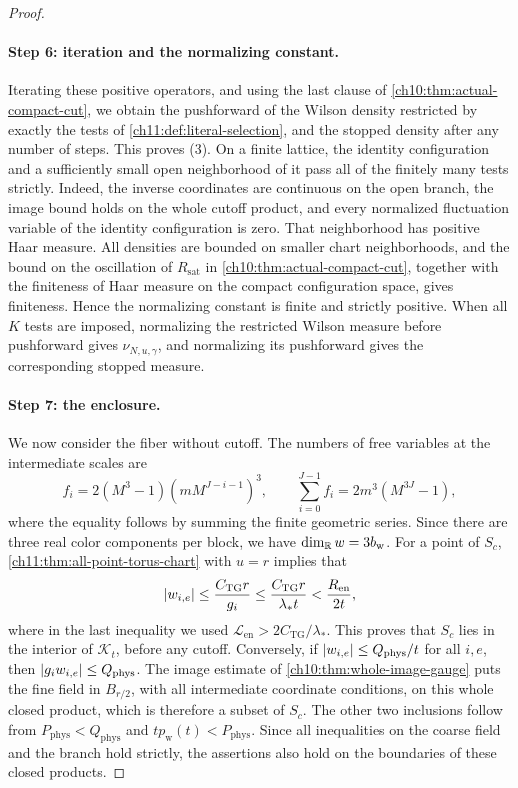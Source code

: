 \begin{proof}
\paragraph{Step 6: iteration and the normalizing constant.}
Iterating these positive operators, and using the last clause of \cref{ch10:thm:actual-compact-cut}, we obtain the pushforward of the Wilson density restricted by exactly the tests of \cref{ch11:def:literal-selection}, and the stopped density after any number of steps. This proves (3). On a finite lattice, the identity configuration and a sufficiently small open neighborhood of it pass all of the finitely many tests strictly. Indeed, the inverse coordinates are continuous on the open branch, the image bound holds on the whole cutoff product, and every normalized fluctuation variable of the identity configuration is zero. That neighborhood has positive Haar measure. All densities are bounded on smaller chart neighborhoods, and the bound on the oscillation of $R_{\mathrm{sat}}$ in \cref{ch10:thm:actual-compact-cut}, together with the finiteness of Haar measure on the compact configuration space, gives finiteness. Hence the normalizing constant is finite and strictly positive. When all $K$ tests are imposed, normalizing the restricted Wilson measure before pushforward gives $\nu_{N,u,\gamma}$, and normalizing its pushforward gives the corresponding stopped measure.

\paragraph{Step 7: the enclosure.}
We now consider the fiber without cutoff. The numbers of free variables at the intermediate scales are
\[
 f_i=2(M^3-1)(mM^{J-i-1})^3,\qquad\sum_{i=0}^{J-1}f_i=2m^3(M^{3J}-1),
\]
where the equality follows by summing the finite geometric series. Since there are three real color components per block, we have $\dim_\mathbb R w=3b_{\mathrm w}$. For a point of $S_c$, \cref{ch11:thm:all-point-torus-chart} with $u=r$ implies that
\[
 \lvert w_{i,e}\rvert\le\frac{C_{\mathrm{TG}}r}{g_i}\le\frac{C_{\mathrm{TG}}r}{\lambda_*t}<\frac{R_{\mathrm{en}}}{2t},
\]
where in the last inequality we used $\mathscr L_{\mathrm{en}}>2C_{\mathrm{TG}}/\lambda_*$. This proves that $S_c$ lies in the interior of $\mathcal K_t$, before any cutoff. Conversely, if $\lvert w_{i,e}\rvert\le Q_{\mathrm{phys}}/t$ for all $i,e$, then $\lvert g_iw_{i,e}\rvert\le Q_{\mathrm{phys}}$. The image estimate of \cref{ch10:thm:whole-image-gauge} puts the fine field in $B_{r/2}$, with all intermediate coordinate conditions, on this whole closed product, which is therefore a subset of $S_c$. The other two inclusions follow from $P_{\mathrm{phys}}<Q_{\mathrm{phys}}$ and $tp_{\mathrm w}(t)<P_{\mathrm{phys}}$. Since all inequalities on the coarse field and the branch hold strictly, the assertions also hold on the boundaries of these closed products.


\end{proof}
